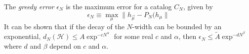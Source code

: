 The \textit{greedy error} $\epsilon_N$ is the maximum error for a catalog $C_N$, given by
\begin{equation}
\epsilon_N \equiv \max_\mu \| h_{\overrightarrow{\mu}} - P_N(h_{\mu} \|
\end{equation}
It can be shown that if the decay of the $N$-width can be bounded by an exponential, $d_N(\mathcal{H}) \leq A \exp^{-c N^\alpha}$ for some real $c$ and $\alpha$, then $\epsilon_N  \leq \tilde{A} \exp^{-d N^\beta}$ where $d$ and $\beta$ depend on $c$ and $\alpha$. 

%